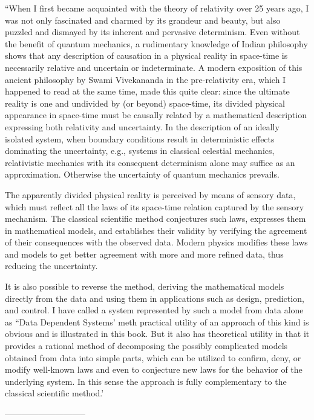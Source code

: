 ``When I first became acquainted with the theory
of relativity over 25 years ago, I was not only
fascinated and charmed by its grandeur and beauty,
but also puzzled and dismayed by its inherent and
pervasive determinism.  Even without the benefit
of quantum mechanics, a rudimentary knowledge of
Indian philosophy shows that any description of
causation in a physical reality in space-time is
necessarily relative and uncertain or
indeterminate.  A modern exposition of this
ancient philosophy by Swami Vivekananda in the
pre-relativity era, which I happened to read at
the same time, made this quite clear: since the
ultimate reality is one and undivided by (or
beyond) space-time, its divided physical
appearance in space-time must be causally related
by a mathematical description expressing both
relativity and uncertainty.  In the description of
an ideally isolated system, when boundary
conditions result in deterministic effects
dominating the uncertainty, e.g., systems in
classical celestial mechanics, relativistic
mechanics with its consequent determinism alone
may suffice as an approximation.  Otherwise the
uncertainty of quantum mechanics prevails.
 
The apparently divided physical reality is
perceived by means of sensory data, which must
reflect all the laws of its space-time relation
captured by the sensory mechanism.  The classical
scientific method conjectures such laws, expresses
them in mathematical models, and establishes their
validity by verifying the agreement of their
consequences with the observed data.  Modern
physics modifies these laws and models to get
better agreement with more and more refined data,
thus reducing the uncertainty.
 
It is also possible to reverse the method,
deriving the mathematical models directly from the
data and using them in applications such as
design, prediction, and control.  I have called a
system represented by such a model from data alone
as ``Data Dependent Systems' meth practical
utility of an approach of this kind is obvious and
is illustrated in this book.  But it also has
theoretical utility in that it provides a rational
method of decomposing the possibly complicated
models obtained from data into simple parts, which
can be utilized to confirm, deny, or modify
well-known laws and even to conjecture new laws
for the behavior of the underlying system.  In
this sense the approach is fully complementary to
the classical scientific method.'
 
-----------------------------
 
